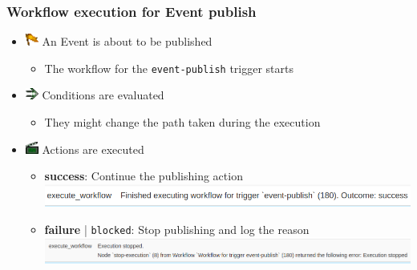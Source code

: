 \begin{frame}
    \frametitle{Workflow execution for Event publish}
    \begin{itemize}
        \setlength\itemsep{1em}
        \item[] \hspace*{-2em}\includegraphics[width=16px]{pictures/sc-event-icon.png} \hspace*{0.25em} An Event is about to be published
        \begin{itemize}
            \item The workflow for the \texttt{event-publish} trigger starts
        \end{itemize}
        \item[] \hspace*{-2em}\includegraphics[width=16px]{pictures/sc-condition-icon.png} \hspace*{0.25em} Conditions are evaluated
        \begin{itemize}
            \item They might change the path taken during the execution
        \end{itemize}
        \item[] \hspace*{-2em}\includegraphics[width=16px]{pictures/sc-action-icon.png} \hspace*{0.25em} Actions are executed
        \begin{itemize}
            \setlength\itemsep{0.75em}
            \item {\bf\color{green!50!black}success}: Continue the publishing action
            \hspace*{-4em}\includegraphics[width=1.0\textwidth]{pictures/log-entry-publish-success.png}
            \item {\bf\color{red}failure} | \texttt{\color{red}blocked}: Stop publishing and log the reason
            \hspace*{-4em}\includegraphics[width=1.0\textwidth]{pictures/log-entry-publish-blocked.png}
        \end{itemize}
    \end{itemize}
\end{frame}


